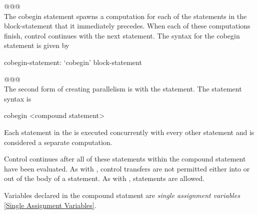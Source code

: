 \noindent @@@\hrulefill \\
The cobegin statement spawns a computation for each of the statements
in the block-statement that it immediately precedes.  When each of
these computations finish, control continues with the next statement.
The syntax for the cobegin statement is given by
\begin{syntax}
cobegin-statement:
  `cobegin' block-statement
\end{syntax}
\noindent @@@\hrulefill \\

The second form of creating parallelism is with the 
statement. The  statement syntax is
\begin{chapel}
cobegin <compound statement> 
\end{chapel}
Each statement in the  is executed 
concurrently with every other statement and is considered a separate 
computation.

Control continues after all of these statements within the compound
statement have been evaluated. As with , control
transfers are not permitted either into or out of the body of a
 statement. As with , 
statements are allowed.

Variables declared in the  compound statment are {\em single
assignment variables} \ref{Single Assignment Variables}. 
